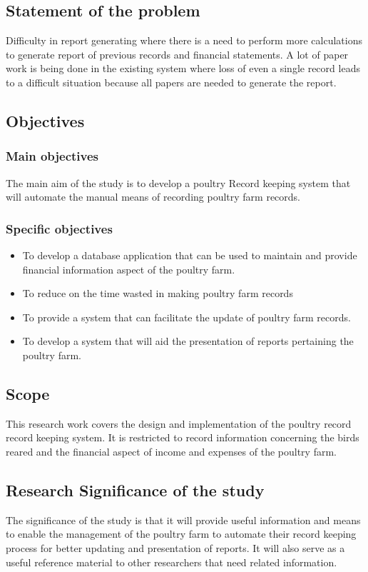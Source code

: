 \documentclass[12pt,]{article}
\begin{document}
\subsection{Statement of the problem}
Difficulty in report generating where there is a need to perform more calculations to generate report of previous records and financial statements. A lot of paper work is being done in the existing system where loss of even a  single record leads to a difficult situation because all papers are needed to generate the report.

\subsection{Objectives}
\subsubsection{Main objectives}
The main aim of the study is to develop a poultry Record keeping system that will automate the manual means of recording poultry farm records.


\subsubsection{Specific objectives}
\begin{itemize}
\item To develop a database application that can be used to maintain and provide financial information aspect of the poultry farm.
\item To reduce on the time wasted in making poultry farm records
\item To provide a system that can facilitate the update of poultry farm records.
\item To develop a system that will aid the presentation of reports pertaining the poultry farm.
\end{itemize}

\subsection{Scope}
This research work covers the design and implementation of the poultry record record keeping system. It is restricted to record information concerning the birds reared and the financial aspect of income and expenses of the poultry farm.
\subsection{Research Significance of the study}

The significance of the study is that it will provide useful information and means to enable the management of the poultry farm to automate their record keeping process for better updating and presentation of reports. It will also serve as a useful reference material to other researchers that need related information.
\end{document}
